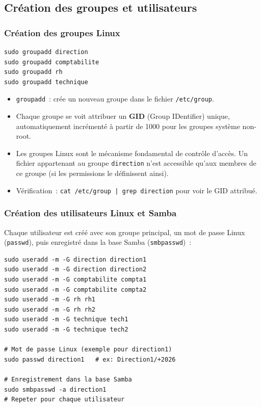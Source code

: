 \documentclass[12pt,a4paper]{article}
\begin{document}
\subsection{Création des groupes et utilisateurs}

\subsubsection{Création des groupes Linux}

\begin{lstlisting}[style=terminal]
sudo groupadd direction
sudo groupadd comptabilite
sudo groupadd rh
sudo groupadd technique
\end{lstlisting}

\begin{explainbox}
\begin{itemize}[leftmargin=1.5em,topsep=2pt]
  \item \texttt{groupadd}~: crée un nouveau groupe dans le fichier \texttt{/etc/group}.
  \item Chaque groupe se voit attribuer un \textbf{GID} (Group IDentifier) unique,
    automatiquement incrémenté à partir de 1000 pour les groupes système non-root.
  \item Les groupes Linux sont le mécanisme fondamental de contrôle d'accès. Un fichier
    appartenant au groupe \texttt{direction} n'est accessible qu'aux membres de ce groupe
    (si les permissions le définissent ainsi).
  \item Vérification~: \texttt{cat /etc/group | grep direction} pour voir le GID attribué.
\end{itemize}
\end{explainbox}

\subsubsection{Création des utilisateurs Linux et Samba}

Chaque utilisateur est créé avec son groupe principal, un mot de passe Linux
(\texttt{passwd}), puis enregistré dans la base Samba (\texttt{smbpasswd})~:

\begin{lstlisting}[style=terminal]
sudo useradd -m -G direction direction1
sudo useradd -m -G direction direction2
sudo useradd -m -G comptabilite compta1
sudo useradd -m -G comptabilite compta2
sudo useradd -m -G rh rh1
sudo useradd -m -G rh rh2
sudo useradd -m -G technique tech1
sudo useradd -m -G technique tech2

# Mot de passe Linux (exemple pour direction1)
sudo passwd direction1   # ex: Direction1/+2026

# Enregistrement dans la base Samba
sudo smbpasswd -a direction1
# Repeter pour chaque utilisateur
\end{lstlisting}
\end{document}
